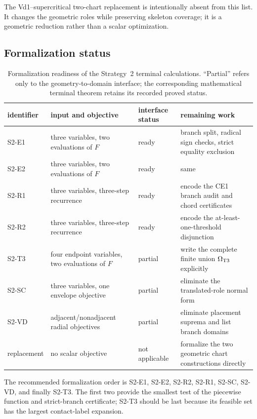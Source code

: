 The Vd1--supercritical two-chart replacement is intentionally absent from
this list.  It changes the geometric roles while preserving skeleton
coverage; it is a geometric reduction rather than a scalar optimization.

\subsection{Formalization status}

\begin{table}[H]
\centering
\small
\renewcommand{\arraystretch}{1.12}
\begin{tabular}{@{}p{}p{}p{}p{}@{}}
\toprule
identifier&input and objective&interface status&remaining work\\
\midrule
S2-E1&three variables, two evaluations of $F$&ready&
branch split, radical sign checks, strict equality exclusion\\
S2-E2&three variables, two evaluations of $F$&ready&
same\\
S2-R1&three variables, three-step recurrence&ready&
encode the CE1 branch audit and chord certificates\\
S2-R2&three variables, three-step recurrence&ready&
encode the at-least-one-threshold disjunction\\
S2-T3&four endpoint variables, two evaluations of $F$&partial&
write the complete finite union $\Omega_{\rm T3}$ explicitly\\
S2-SC&three variables, one envelope objective&partial&
eliminate the translated-role normal form\\
S2-VD&adjacent/nonadjacent radial objectives&partial&
eliminate placement suprema and list branch domains\\
replacement&no scalar objective&not applicable&
formalize the two geometric chart constructions directly\\
\bottomrule
\end{tabular}
\caption{Formalization readiness of the Strategy~2 terminal calculations.
``Partial'' refers only to the geometry-to-domain interface; the corresponding
mathematical terminal theorem retains its recorded proved status.}
\label{tab:s2-formalization-status}
\end{table}

The recommended formalization order is S2-E1, S2-E2, S2-R2, S2-R1, S2-SC,
S2-VD, and finally S2-T3.  The first two provide the smallest test of the
piecewise function and strict-branch certificate; S2-T3 should be last because
its feasible set has the largest contact-label expansion.
